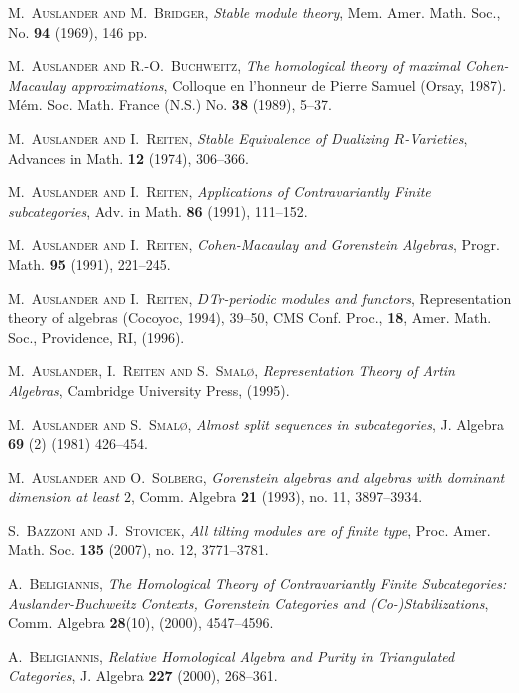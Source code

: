 \documentclass[oneside, a4paper,reqno]{amsart}
\numberwithin{equation}{section}
\theoremstyle{definition}
\begin{document}
\begin{thebibliography}{99}
\textsc{M.~Auslander and M.~Bridger}, \textit{Stable module theory}, Mem.
Amer. Math. Soc.,  No. {\bf 94} (1969), 146 pp.

\textsc{M.~Auslander and R.-O.~Buchweitz}, \textit{The homological theory of
maximal Cohen-Macaulay approximations}, Colloque en l'honneur de
Pierre Samuel (Orsay, 1987). M\'em. Soc. Math. France (N.S.)  No.
{\bf 38} (1989), 5--37.

\textsc{M.~Auslander and I.~Reiten}, \textit{Stable Equivalence of
Dualizing $R$-Varieties}, Advances in Math. {\bf 12} (1974),
306--366.

\textsc{M.~Auslander and I.~Reiten}, \textit{Applications of Contravariantly Finite
subcategories}, Adv. in Math. {\bf 86} (1991), 111--152.

\textsc{M.~Auslander and I.~Reiten}, \textit{Cohen-Macaulay and Gorenstein
Algebras}, Progr. Math. {\bf 95} (1991), 221--245.

\textsc{M.~Auslander and I.~Reiten}, \textit{$D$Tr-periodic modules and functors},
Representation theory of algebras (Cocoyoc, 1994),  39--50, CMS
Conf. Proc., {\bf 18}, Amer. Math. Soc., Providence, RI, (1996).

\textsc{M.~Auslander,  I.~Reiten and S.~Smal{\o}}, \textit{Representation
Theory of Artin Algebras}, Cambridge University Press, (1995).

\textsc{M.~Auslander and S.~Smal{\o}}, \textit{Almost split sequences in
subcategories}, J. Algebra {\bf 69} (2) (1981) 426--454.

\textsc{M.~Auslander and O.~Solberg}, \textit{Gorenstein algebras and
algebras with dominant dimension at least $2$}, Comm. Algebra {\bf
21} (1993), no. 11, 3897--3934.

\textsc{S.~Bazzoni and J.~Stovicek}, \textit{All tilting modules are of
finite type},  Proc. Amer. Math. Soc.  {\bf 135}  (2007), no. 12,
3771--3781.

\textsc{A.~Beligiannis}, \textit{The Homological Theory of
Contravariantly Finite Subcategories: Auslander-Buchweitz Contexts,
Gorenstein Categories and (Co-)Stabilizations}, Comm. Algebra {\bf
28}(10), (2000), 4547--4596.

\textsc{A.~Beligiannis}, \textit{Relative Homological Algebra and Purity in
Triangulated Categories},  J. Algebra {\bf 227} (2000), 268--361.


\end{thebibliography}
\end{document}

